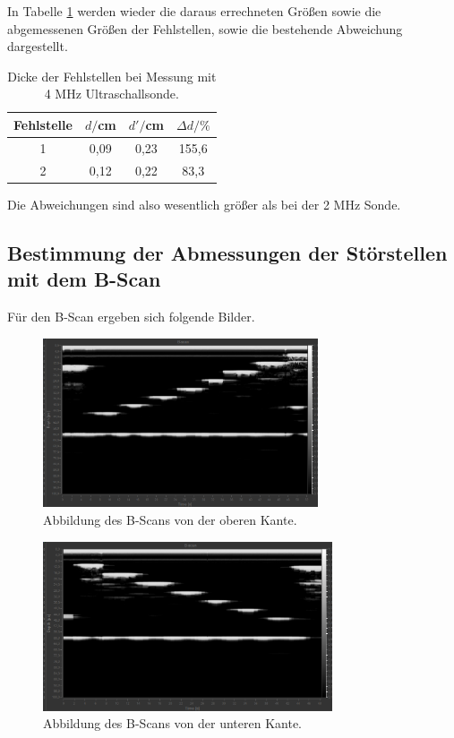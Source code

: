 In Tabelle \ref{tab:3} werden wieder die daraus errechneten Größen sowie die abgemessenen Größen der Fehlstellen,
sowie die bestehende Abweichung dargestellt.

\begin{table}[H]
  \centering
  \caption{Dicke der Fehlstellen bei Messung mit 4 MHz Ultraschallsonde.}
  \label{tab:3}
  \begin{tabular}{c c c c}
    \toprule
  Fehlstelle & $d/$cm & $d'/$cm & $\Delta d/ \%$  \\
    \midrule
    1  &  0,09 & 0,23 & 155,6    \\
    2  &  0,12 & 0,22 & 83,3  \\
    \bottomrule
  \end{tabular}
\end{table}

Die Abweichungen sind also wesentlich größer als bei der 2 MHz Sonde.

\subsection{Bestimmung der Abmessungen der Störstellen mit dem B-Scan}

Für den B-Scan ergeben sich folgende Bilder.

\begin{figure}[H]
  \centering
  \includegraphics[height=5cm]{BScanoben.PNG}
  \caption{Abbildung des B-Scans von der oberen Kante.}
  \label{fig:acryl}
\end{figure}

\begin{figure}[H]
  \centering
  \includegraphics[height=5cm]{B-Scanunten.PNG}
  \caption{Abbildung des B-Scans von der unteren Kante.}
  \label{fig:acryl}
\end{figure}

